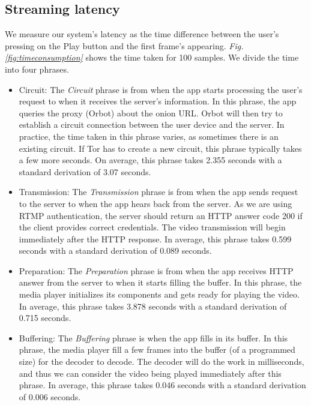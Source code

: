 \subsection{Streaming latency}
\label{subsec:streaming_latency}
We measure our system's latency as the time difference between the user’s pressing on the Play button and the first frame’s appearing. \textit{Fig. \ref{fig:timeconsumption}} shows the time taken for 100 samples. We divide the time into four phrases.
\begin{itemize}
	\item Circuit: The \textit{Circuit} phrase is from when the app starts processing the user’s request to when it receives the server's information. In this phrase, the app queries the proxy (Orbot) about the onion URL. Orbot will then try to establish a circuit connection between the user device and the server. In practice, the time taken in this phrase varies, as sometimes there is an existing circuit. If Tor has to create a new circuit, this phrase typically takes a few more seconds. On average, this phrase takes 2.355 seconds with a standard derivation of 3.07 seconds.
	\item Transmission: The \textit{Transmission} phrase is from when the app sends request to the server to when the app hears back from the server. As we are using RTMP authentication, the server should return an HTTP answer code 200 if the client provides correct credentials. The video transmission will begin immediately after the HTTP response. In average, this phrase takes 0.599 seconds with a standard derivation of 0.089 seconds.
	\item Preparation: The \textit{Preparation} phrase is from when the app receives HTTP answer from the server to when it starts filling the buffer. In this phrase, the media player initializes its components and gets ready for playing the video. In average, this phrase takes 3.878 seconds with a standard derivation of 0.715 seconds.
	\item Buffering: The \textit{Buffering} phrase is when the app fills in its buffer. In this phrase, the media player fill a few frames into the buffer (of a programmed size) for the decoder to decode. The decoder will do the work in milliseconds, and thus we can consider the video being played immediately after this phrase. In average, this phrase takes 0.046 seconds with a standard derivation of 0.006 seconds.
\end{itemize}

